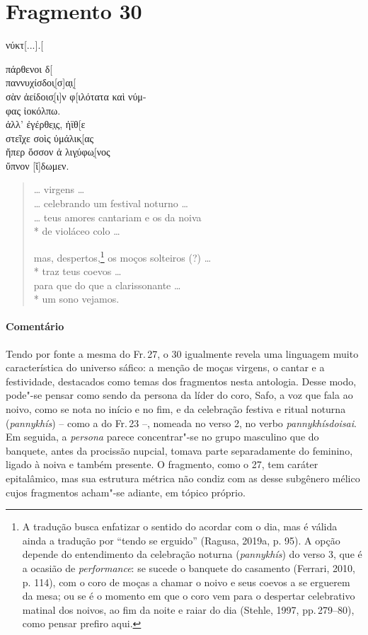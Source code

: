 \pagebreak
\section{Fragmento 30}

\begin{gkverse}
νύκτ[...].[

πάρθενοι δ[\\
παννυχίσδοι̣[σ]α̣ι[̣\\
σὰν ἀείδοισ̣[ι]ν φ[ιλότατα καὶ νύμ-\\
φας ἰοκόλπω.\\
ἀλλ’ ἐγέρθε̣ι̣ς, ἠϊθ[ε\\
στεῖχε σοὶς ὐμάλικ̣[ας\\
ἤπερ ὄσσον ἀ λιγ̣ύφω̣[νος\\
ὔπνον [ἴ]δωμεν.
\end{gkverse}

\begin{verse}
\ldots{} virgens \ldots{}\\
\ldots{} celebrando um festival noturno \ldots{}\\
\ldots{} teus amores cantariam e os da noiva\\*
de violáceo colo \ldots{}

mas, despertos,\footnote{A tradução busca enfatizar o sentido do acordar com o dia, mas é válida ainda a tradução por ``tendo se erguido'' (Ragusa, 2019a, p. 95). A opção depende do entendimento da celebração noturna (\textit{pannykhís}) do verso 3, que é a ocasião de \textit{performance}:  se sucede o banquete do casamento (Ferrari, 2010, p. 114), com o coro de moças a chamar o noivo e seus coevos a se erguerem da mesa; ou se é o momento em que o coro vem para o despertar celebrativo matinal dos noivos, ao fim da noite e raiar do dia (Stehle, 1997, pp.\,279--80), como pensar prefiro aqui.} os moços solteiros (?) \ldots{}\\*
traz teus coevos  \ldots{}\\
para que do que a clarissonante \ldots{}\\*
um sono vejamos.
\end{verse}
\pagebreak
{\paragraph{Comentário} Tendo por fonte a mesma do Fr.\,27, o 30 igualmente revela uma linguagem muito característica do universo sáfico: a menção de moças virgens, o cantar e a festividade, destacados como temas dos fragmentos nesta antologia. Desse modo, pode"-se pensar como sendo da persona da líder do coro, Safo, a
voz que fala ao noivo, como se nota no início e no fim, e da celebração
festiva e ritual noturna (\textit{pannykhís}) -- como a do Fr.\,23 --, nomeada no verso 2, no verbo \textit{pannykhísdoisai}. Em seguida, a \textit{persona} parece concentrar"-se no grupo masculino que do
banquete, antes da procissão nupcial, tomava parte separadamente do feminino,
ligado à noiva e também presente. O fragmento, como o 27, tem caráter
epitalâmico, mas sua estrutura métrica não condiz com as desse subgênero
mélico cujos fragmentos acham"-se adiante, em tópico próprio.}


